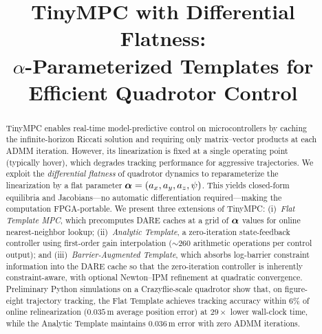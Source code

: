 \title{TinyMPC with Differential Flatness:\\
  $\alpha$-Parameterized Templates for Efficient Quadrotor Control}

\author{
}

\maketitle

\begin{abstract}
TinyMPC enables real-time model-predictive control on microcontrollers
by caching the infinite-horizon Riccati solution and requiring
only matrix--vector products at each ADMM iteration.
However, its linearization is fixed at a single operating point
(typically hover), which degrades tracking performance for aggressive
trajectories.
We exploit the \emph{differential flatness} of quadrotor dynamics
to reparameterize the linearization by a flat parameter
$\bm{\alpha} = (a_x, a_y, a_z, \psi)$.
This yields closed-form equilibria and Jacobians---no automatic
differentiation required---making the computation FPGA-portable.
We present three extensions of TinyMPC:
(i)~\emph{Flat Template MPC}, which precomputes DARE caches at a grid
of $\bm{\alpha}$ values for online nearest-neighbor lookup;
(ii)~\emph{Analytic Template}, a zero-iteration state-feedback
controller using first-order gain interpolation (${\sim}260$
arithmetic operations per control output);
and (iii)~\emph{Barrier-Augmented Template}, which absorbs
log-barrier constraint information into the DARE cache so
that the zero-iteration controller is inherently constraint-aware,
with optional Newton--IPM refinement at quadratic convergence.
Preliminary Python simulations on a Crazyflie-scale quadrotor show
that, on figure-eight trajectory tracking,
the Flat Template achieves tracking accuracy within 6\% of
online relinearization ($0.035$\,m average position error)
at $29\times$ lower wall-clock time,
while the Analytic Template maintains $0.036$\,m error with
zero ADMM iterations.
\end{abstract}
